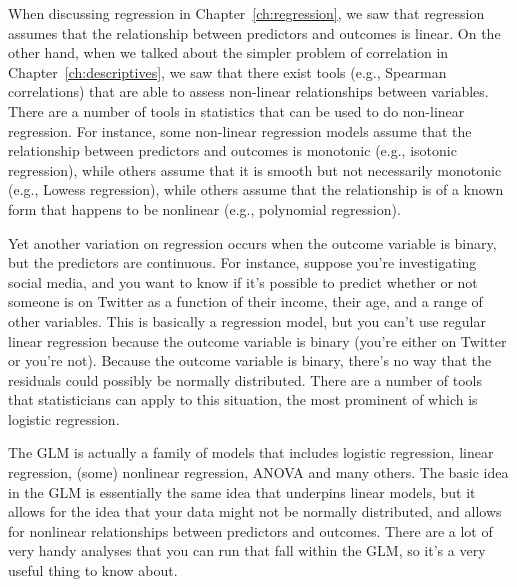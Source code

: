 \begin{itemize}
 When discussing regression in Chapter~\ref{ch:regression}, we saw that regression assumes that the relationship between predictors and outcomes is linear. On the other hand, when we talked about the simpler problem of correlation in Chapter~\ref{ch:descriptives}, we saw that there exist tools (e.g., Spearman correlations) that are able to assess non-linear relationships between variables. There are a number of tools in statistics that can be used to do non-linear regression. For instance,  some non-linear regression models assume that the relationship between predictors and outcomes is monotonic (e.g., isotonic regression), while others assume that it is smooth but not necessarily monotonic (e.g., Lowess regression), while others assume that the relationship is of a known form that happens to be nonlinear (e.g., polynomial regression). 

 Yet another variation on regression occurs when the outcome variable is binary, but the predictors are continuous. For instance, suppose you're investigating social media, and you want to know if it's possible to predict whether or not someone is on Twitter as a function of their income, their age, and a range of other variables. This is basically a regression model, but you can't use regular linear regression because the outcome variable is binary (you're either on Twitter or you're not). Because the outcome variable is binary, there's no way that the residuals could possibly be normally distributed. There are a number of tools that statisticians can apply to this situation, the most prominent of which is logistic regression.  

 The GLM is actually a family of models that includes logistic regression, linear regression, (some) nonlinear regression, ANOVA and many others. The basic idea in the GLM is essentially the same idea that underpins linear models, but it allows for the idea that your data might not be normally distributed, and allows for nonlinear relationships between predictors and outcomes. There are a lot of very handy analyses that you can run that fall within the GLM, so it's a very useful thing to know about.  


\end{itemize}
